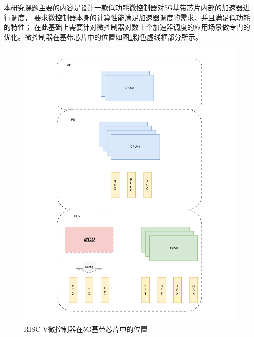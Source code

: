 \documentclass[a4paper, 12pt]{article}
\begin{document}
本研究课题主要的内容是设计一款低功耗微控制器对5G基带芯片内部的加速器进行调度，
要求微控制器本身的计算性能满足加速器调度的需求、并且满足低功耗的特性\cite{10163410}；
在此基础上需要针对微控制器对数十个加速器调度的应用场景做专门的优化。微控制器在基带芯片中的位置如图\ref{fig:pic1}粉色虚线框部分所示。
\begin{figure}[htbp]
  \centering
  \includegraphics[scale=0.5]{./images/mcu_location.pdf}
  \caption{RISC-V微控制器在5G基带芯片中的位置}
  \label{fig:pic1}
\end{figure}

\clearpage
\end{document}
